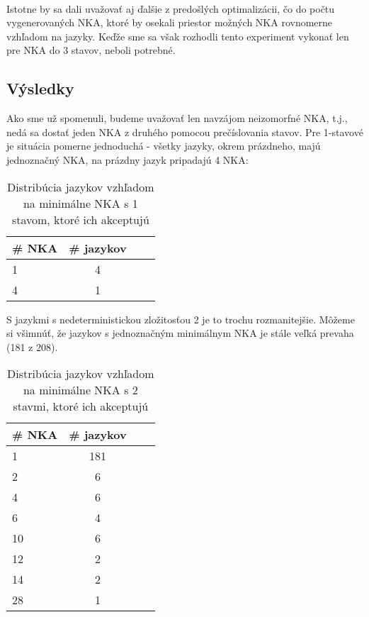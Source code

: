 \paragraph{}
Istotne by sa dali uvažovať aj ďalšie z predošlých optimalizácii, čo do počtu vygenerovaných NKA, ktoré by osekali priestor možných NKA rovnomerne vzhľadom na jazyky. Keďže sme sa však rozhodli tento experiment vykonať len pre NKA do 3 stavov, neboli potrebné. 

\subsection{Výsledky}

Ako sme už spomenuli, budeme uvažovať len navzájom neizomorfné NKA, t.j., nedá sa dostať jeden NKA z druhého pomocou prečíslovania stavov. 
Pre 1-stavové je situácia pomerne jednoduchá - všetky jazyky, okrem prázdneho, majú jednoznačný NKA, na prázdny jazyk pripadajú 4 NKA:

\begin{table}[H]
  \centering
  \begin{tabular}{|l|c|c|r|}
    \hline
    \# NKA & \# jazykov \\ 
    \hline
    1 & 4 \\
    \hline
    4 & 1 \\
    \hline
  \end{tabular}
  \caption{Distribúcia jazykov vzhľadom na minimálne NKA s 1 stavom, ktoré ich akceptujú}
\end{table}

S jazykmi s nedeterministickou zložitosťou 2 je to trochu rozmanitejšie. Môžeme si všimnúť, že jazykov s jednoznačným minimálnym NKA je stále veľká prevaha (181 z 208).

\begin{table}[H]
  \centering
  \begin{tabular}{|l|c|c|r|}
    \hline
    \# NKA & \# jazykov \\ 
    \hline
    1 & 181 \\
    \hline
    2 & 6 \\
    \hline
    4 & 6 \\
    \hline
    6 & 4 \\
    \hline
    10 & 6 \\
    \hline
    12 & 2 \\
    \hline
    14 & 2 \\
    \hline
    28 & 1 \\
    \hline
  \end{tabular}
  \caption{Distribúcia jazykov vzhľadom na minimálne NKA s 2 stavmi, ktoré ich akceptujú}
\end{table}

